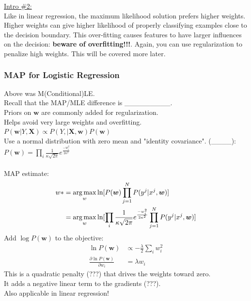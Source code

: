  \underline{Intro \#2:}   \hfill \\
 
Like in linear regression, the maximum likelihood solution prefers higher weights.  
Higher weights can give higher likelihood of properly classifying examples close to the decision boundary.  
This over-fitting causes features to have larger influences on the decision:  \textbf{beware of overfitting!!!}. 
Again, you can use regularization to penalize high weights.
This will be covered more later. 
\hfill \\

\subsubsection{MAP for Logistic Regression}
Above was M(Conditional)LE.     \hfill \\
Recall that the MAP/MLE difference is \_\_\_\_\_\_\_\_\_.  \hfill \\
Priors on $\bm{w}$ are commonly added for regularization.    \hfill \\
Helps avoid very large weights and overfitting.    \hfill \\
$P(\bm{w} | Y, \bm{X}) \propto P(Y, | \bm{X}, \bm{w} ) P(\bm{w} )$  \hfill \\
Use a normal distribution with zero mean and "identity covariance".  (\_\_\_\_):  \hfill \\
$ \displaystyle  P(\bm{w} ) = \prod_i \frac{1}{\kappa \sqrt{2 \pi}} e^{\frac{-w_i^2}{2 \kappa^2}}$ \hfill \\
\hfill \\

MAP estimate: 
\begin{align*}
	w* &= \operatorname*{arg\,max}_w \ln[P(\bm{w}) \prod_{j=1}^N P(y^j | x^j, \bm{w})]  \\
		&= \operatorname*{arg\,max}_w \ln[ \prod_i \frac{1}{\kappa \sqrt{2 \pi}} e^{\frac{-w_i^2}{2 \kappa^2}}   \prod_{j=1}^N P(y^j | x^j, \bm{w})]
\end{align*}
Add $\log P(\bm{w})$ to the objective:
\begin{align*}
	\ln P(\bm{w}) & \propto - \frac{\lambda}{2} \sum_i w_i^2 \\
	\frac{\partial \ln P(\bm{w})}{\partial w_i} &= \lambda w_i
\end{align*}
This is a quadratic penalty (???) that drives the weights toward zero. \hfill \\
It adds a negative linear term to the gradients (???).  \hfill \\
Also applicable in linear regression! 

